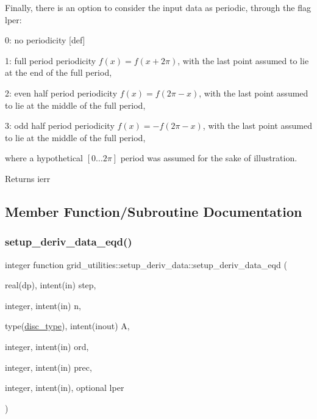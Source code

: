 Finally, there is an option to consider the input data as periodic, through the flag {\ttfamily lper\+:} 
\begin{DoxyItemize}
\item 0\+: no periodicity \mbox{[}def\mbox{]}
\item 1\+: full period periodicity $f(x) = f(x+2\pi)$, with the last point assumed to lie at the end of the full period,
\item 2\+: even half period periodicity $f(x) = f(2\pi-x)$, with the last point assumed to lie at the middle of the full period,
\item 3\+: odd half period periodicity $f(x) = -f(2\pi-x)$, with the last point assumed to lie at the middle of the full period,
\end{DoxyItemize}

where a hypothetical $\left[0\ldots 2\pi\right]$ period was assumed for the sake of illustration.

\begin{DoxyReturn}{Returns}
ierr 
\end{DoxyReturn}


\subsection{Member Function/\+Subroutine Documentation}
\mbox{\label{interfacegrid__utilities_1_1setup__deriv__data_aab03825f796bfe596b2df18bbcab86b8}} 
\subsubsection{\texorpdfstring{setup\+\_\+deriv\+\_\+data\+\_\+eqd()}{setup\_deriv\_data\_eqd()}}
{\footnotesize\ttfamily integer function grid\+\_\+utilities\+::setup\+\_\+deriv\+\_\+data\+::setup\+\_\+deriv\+\_\+data\+\_\+eqd (\begin{DoxyParamCaption}\item[{real(dp), intent(in)}]{step,  }\item[{integer, intent(in)}]{n,  }\item[{type(\hyperlink{structgrid__vars_1_1disc__type}{disc\+\_\+type}), intent(inout)}]{A,  }\item[{integer, intent(in)}]{ord,  }\item[{integer, intent(in)}]{prec,  }\item[{integer, intent(in), optional}]{lper }\end{DoxyParamCaption})}



